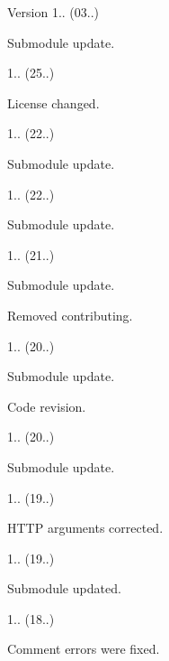 \begin{DoxyVersion}{Version}
1.. (03..)
\begin{DoxyItemize}
\item Submodule update. 
\end{DoxyItemize}

1.. (25..)
\begin{DoxyItemize}
\item License changed. 
\end{DoxyItemize}

1.. (22..)
\begin{DoxyItemize}
\item Submodule update. 
\end{DoxyItemize}

1.. (22..)
\begin{DoxyItemize}
\item Submodule update. 
\end{DoxyItemize}

1.. (21..)
\begin{DoxyItemize}
\item Submodule update.
\item Removed contributing. 
\end{DoxyItemize}

1.. (20..)
\begin{DoxyItemize}
\item Submodule update.
\item Code revision. 
\end{DoxyItemize}

1.. (20..)
\begin{DoxyItemize}
\item Submodule update. 
\end{DoxyItemize}

1.. (19..)
\begin{DoxyItemize}
\item H\+T\+TP arguments corrected. 
\end{DoxyItemize}

1.. (19..)
\begin{DoxyItemize}
\item Submodule updated. 
\end{DoxyItemize}

1.. (18..)
\begin{DoxyItemize}
\item Comment errors were fixed. 
\end{DoxyItemize}


\end{DoxyVersion}
